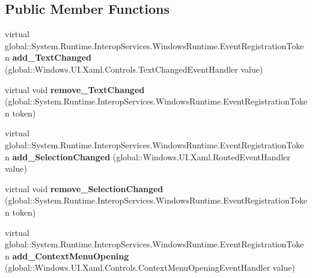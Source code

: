 \subsection*{Public Member Functions}
\begin{DoxyCompactItemize}
\item 
\mbox{\label{class_windows_1_1_u_i_1_1_xaml_1_1_controls_1_1_text_box_a206b2889087ba0dbfe818431045788ff}} 
virtual global\+::\+System.\+Runtime.\+Interop\+Services.\+Windows\+Runtime.\+Event\+Registration\+Token {\bfseries add\+\_\+\+Text\+Changed} (global\+::\+Windows.\+U\+I.\+Xaml.\+Controls.\+Text\+Changed\+Event\+Handler value)
\item 
\mbox{\label{class_windows_1_1_u_i_1_1_xaml_1_1_controls_1_1_text_box_a35ae456324ad400806b770d7c47c57b4}} 
virtual void {\bfseries remove\+\_\+\+Text\+Changed} (global\+::\+System.\+Runtime.\+Interop\+Services.\+Windows\+Runtime.\+Event\+Registration\+Token token)
\item 
\mbox{\label{class_windows_1_1_u_i_1_1_xaml_1_1_controls_1_1_text_box_aa7a814e90af6bc70d3d39b87e1dcc130}} 
virtual global\+::\+System.\+Runtime.\+Interop\+Services.\+Windows\+Runtime.\+Event\+Registration\+Token {\bfseries add\+\_\+\+Selection\+Changed} (global\+::\+Windows.\+U\+I.\+Xaml.\+Routed\+Event\+Handler value)
\item 
\mbox{\label{class_windows_1_1_u_i_1_1_xaml_1_1_controls_1_1_text_box_ab695fdfc9633cf4e369d19dceb2d3327}} 
virtual void {\bfseries remove\+\_\+\+Selection\+Changed} (global\+::\+System.\+Runtime.\+Interop\+Services.\+Windows\+Runtime.\+Event\+Registration\+Token token)
\item 
\mbox{\label{class_windows_1_1_u_i_1_1_xaml_1_1_controls_1_1_text_box_ab836344ac1b9e4cb88bf838f48407e7c}} 
virtual global\+::\+System.\+Runtime.\+Interop\+Services.\+Windows\+Runtime.\+Event\+Registration\+Token {\bfseries add\+\_\+\+Context\+Menu\+Opening} (global\+::\+Windows.\+U\+I.\+Xaml.\+Controls.\+Context\+Menu\+Opening\+Event\+Handler value)
\item 

\end{DoxyCompactItemize}
